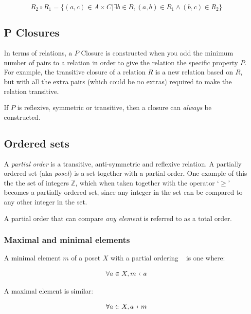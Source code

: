 \[
	R_2 \circ R_1 = \{(a,c) \in A \times C | \exists b \in B, (a,b) \in R_1 \wedge (b,c) \in R_2 \}
\]


\subsection{P Closures}

In terms of relations, a $P$ Closure is constructed when you add the minimum
number of pairs to a relation in order to give the relation the specific
property $P$. For example, the transitive closure of a relation $R$ is a new
relation based on $R$, but with all the extra pairs (which could be no extras)
required to make the relation transitive.

If $P$ is reflexive, symmetric or transitive, then a closure can {\it always} be
constructed.

\subsection{Ordered sets}

A {\it partial order} is a transitive, anti-symmetric and reflexive relation. A
partially ordered set (aka {\it poset}) is a set together with a partial order.
One example of this the the set of integers $\mathbb{Z}$, which when taken
together with the operator `$\geq$' becomes a partially ordered set, since any
integer in the set can be compared to any other integer in the set.

A partial order that can compare {\it any element} is referred to as a total
order.

\subsubsection{Maximal and minimal elements}

A minimal element $m$ of a poset $X$ with a partial ordering \guilsinglleft~
is one where:

\[
	\forall a \in X, m~\textrm{\guilsinglleft}~a
\]

A maximal element is similar:


\[
	\forall a \in X, a~\textrm{\guilsinglleft}~m
\]
